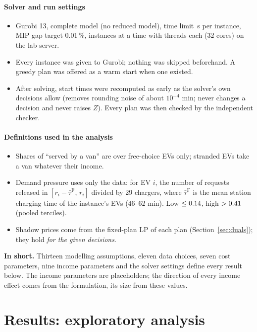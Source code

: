 \documentclass[11pt,a4paper]{article}
\newcommand{\inshort}[1]{\begin{insum}\textbf{In short.} #1\end{insum}}
\newcommand{\pct}{\,\%}
\begin{document}
\subsection{Solver and run settings}
\begin{itemize}
  \item Gurobi 13, complete model (no reduced model), time limit \TimeLimit\,s per instance, MIP gap target 0.01\pct, \Workers{} instances at a time with \Threads{} threads each (32 cores) on the lab server.
  \item Every instance was given to Gurobi; nothing was skipped beforehand. A greedy plan was offered as a warm start when one existed.
  \item After solving, start times were recomputed as early as the solver's own decisions allow (removes rounding noise of about $10^{-4}$ min; never changes a decision and never raises $Z$). Every plan was then checked by the independent checker.
\end{itemize}

\subsection{Definitions used in the analysis}
\begin{itemize}
  \item Shares of ``served by a van'' are over free-choice EVs only; stranded EVs take a van whatever their income.
  \item Demand pressure uses only the data: for EV $i$, the number of requests released in $[r_i-\bar\tau^{\mathrm F},\,r_i]$ divided by 29 chargers, where $\bar\tau^{\mathrm F}$ is the mean station charging time of the instance's EVs (46--62 min). Low $\le0.14$, high $>0.41$ (pooled terciles).
  \item Shadow prices come from the fixed-plan LP of each plan (Section~\ref{sec:duals}); they hold \emph{for the given decisions}.
\end{itemize}

\inshort{Thirteen modelling assumptions, eleven data choices, seven cost parameters, nine income parameters and the solver settings define every result below. The income parameters are placeholders; the direction of every income effect comes from the formulation, its size from these values.}

\clearpage
\part{Results: exploratory analysis}
\end{document}
